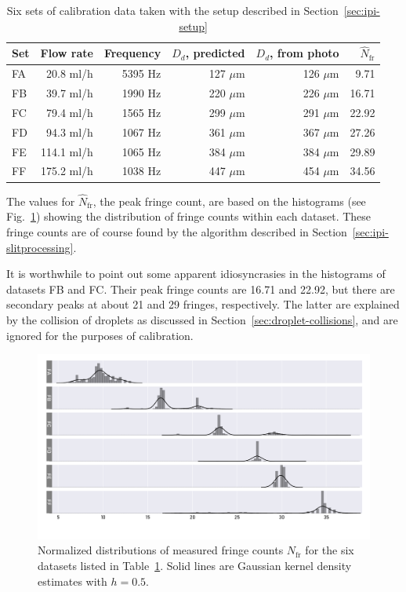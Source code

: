 \documentclass[11.5pt,oneside]{book}
\newcommand*{\figref}[1]{Fig.~\ref{#1}}
\newcommand*{\secref}[1]{Section~\ref{#1}}
\newcommand*{\tableref}[1]{Table~\ref{#1}}
\begin{document}
\begin{table}[h!]
    \centering
    \begin{tabular}{lrrrrr}
    \toprule
    Set & Flow rate & Frequency & $D_d$, predicted  & $D_d$, from
photo & $\hat{N}_\text{fr}$ \\
    \midrule
    FA & 20.8  ml/h  & 5395 Hz  & 127 $\mu$m  & 126 $\mu$m &  9.71      \\
    FB & 39.7  ml/h  & 1990 Hz  & 220 $\mu$m  & 226 $\mu$m &  16.71     \\
    FC & 79.4  ml/h  & 1565 Hz  & 299 $\mu$m  & 291 $\mu$m &  22.92     \\
    FD & 94.3  ml/h  & 1067 Hz  & 361 $\mu$m  & 367 $\mu$m &  27.26     \\
    FE & 114.1 ml/h  & 1065 Hz  & 384 $\mu$m  & 384 $\mu$m &  29.89     \\
    FF & 175.2 ml/h  & 1038 Hz  & 447 $\mu$m  & 454 $\mu$m &  34.56     \\
    \bottomrule
\end{tabular}
\caption{Six sets of calibration data taken with the setup described in \secref{sec:ipi-setup}}
\label{tab:ipi-calibration-datasets}
\end{table}
The values for $\hat{N}_\text{fr}$, the peak fringe count, are based on the
histograms (see \figref{fig:fringe-histograms}) showing the distribution of
fringe counts within each dataset. These fringe counts are of course found by
the algorithm described in \secref{sec:ipi-slitprocessing}.

It is worthwhile to point out some apparent idiosyncrasies in the histograms of
datasets FB and FC. Their peak fringe counts are 16.71 and 22.92, but there are
secondary peaks at about 21 and 29 fringes, respectively. The latter are
explained by the collision of droplets as discussed in
\secref{sec:droplet-collisions}, and are ignored for the purposes of
calibration.

\begin{figure}
    \centering
    \includegraphics[width=\textwidth]{img/fringe_histogram.pdf}
    \caption{Normalized distributions of measured fringe counts $N_\text{fr}$
        for the six datasets listed in \tableref{tab:ipi-calibration-datasets}. Solid lines are
Gaussian kernel density estimates with $h=0.5$. }
    \label{fig:fringe-histograms}
\end{figure}
\end{document}
